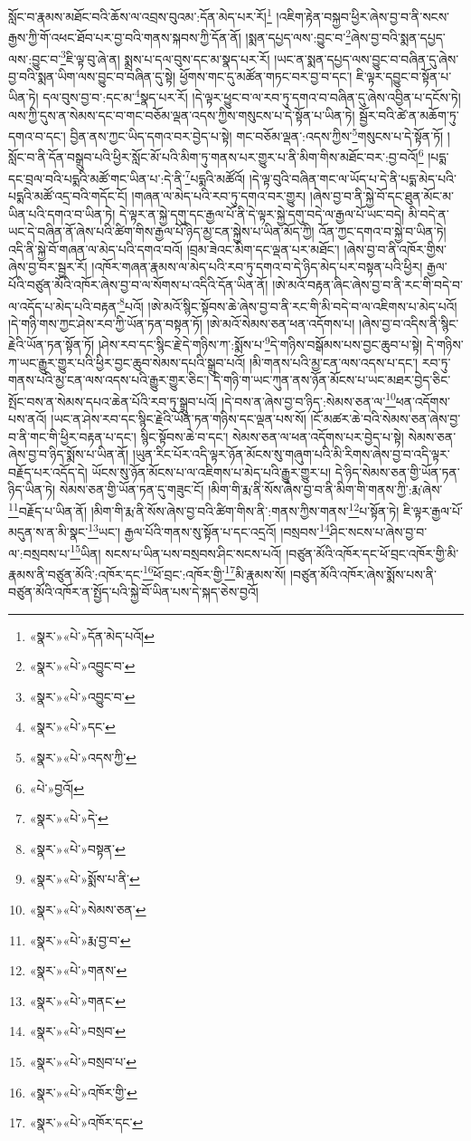 སློང་བ་རྣམས་མཐོང་བའི་ཆོས་ལ་འབྲས་བུའམ་:དོན་མེད་པར་རོ།\footnote{«སྣར་»«པེ་»དོན་མེད་པའོ།} །འཇིག་རྟེན་བསྐྱབ་ཕྱིར་ཞེས་བྱ་བ་ནི་སངས་རྒྱས་ཀྱི་གོ་འཕང་ཐོབ་པར་བྱ་བའི་གནས་སྐབས་ཀྱི་དོན་ནོ། །སྨན་དཔྱད་ལས་:བྱུང་བ་\footnote{«སྣར་»«པེ་»འབྱུང་བ་}ཞེས་བྱ་བའི་སྨན་དཔྱད་ལས་:བྱུང་བ་\footnote{«སྣར་»«པེ་»འབྱུང་བ་}ཇི་ལྟ་བུ་ཞེ་ན། སྨྲས་པ་དལ་བུས་དང་མ་སྣད་པར་རོ། །ཡང་ན་སྨན་དཔྱད་ལས་བྱུང་བ་བཞིན་དུ་ཞེས་བྱ་བའི་སྨན་ཡིག་ལས་བྱུང་བ་བཞིན་དུ་སྟེ། ཕྱོགས་གང་དུ་མཚོན་གཏང་བར་བྱ་བ་དང་། ཇི་ལྟར་དབྱུང་བ་སྟོན་པ་ཡིན་ཏེ། དལ་བུས་བྱ་བ་:དང་མ་\footnote{«སྣར་»«པེ་»དང་}སྣད་པར་རོ། །དེ་ལྟར་ཕྱུང་བ་ལ་རབ་ཏུ་དགའ་བ་བཞིན་དུ་ཞེས་འབྱིན་པ་དངོས་ཏེ། ལས་ཀྱི་དུས་ན་སེམས་དང་བ་གང་བཅོམ་ལྡན་འདས་ཀྱིས་གསུངས་པ་དེ་སྟོན་པ་ཡིན་ཏེ། སྦྱོར་བའི་ཚེ་ན་མཆོག་ཏུ་དགའ་བ་དང་། བྱིན་ནས་ཀྱང་ཡིད་དགའ་བར་བྱེད་པ་སྟེ། གང་བཅོམ་ལྡན་:འདས་ཀྱིས་\footnote{«སྣར་»«པེ་»འདས་ཀྱི་}གསུངས་པ་དེ་སྟོན་ཏོ། །སློང་བ་ནི་དོན་བསྒྲུབ་པའི་ཕྱིར་སློང་མོ་པའི་མིག་ཏུ་གནས་པར་གྱུར་པ་ནི་མིག་གིས་མཐོང་བར་:བྱ་བའོ།\footnote{«པེ་»བྱའོ།} །པདྨ་དང་བྲལ་བའི་པདྨའི་མཚོ་གང་ཡིན་པ་:དེ་ནི་\footnote{«སྣར་»«པེ་»དེ་}པདྨའི་མཚོའོ། །དེ་ལྟ་བུའི་བཞིན་གང་ལ་ཡོད་པ་དེ་ནི་པདྨ་མེད་པའི་པདྨའི་མཚོ་འདྲ་བའི་གདོང་ངོ། །གཞན་ལ་མེད་པའི་རབ་ཏུ་དགའ་བར་གྱུར། །ཞེས་བྱ་བ་ནི་སྐྱེ་བོ་དང་ཐུན་མོང་མ་ཡིན་པའི་དགའ་བ་ཡིན་ཏེ། དེ་ལྟར་ན་སྐྱེ་དགུ་དང་རྒྱལ་པོ་ནི་དེ་ལྟར་སྐྱེ་དགུ་བདེ་ལ་རྒྱལ་པོ་ཡང་བདེ། མི་བདེ་ན་ཡང་དེ་བཞིན་ནོ་ཞེས་པའི་ཚིག་གིས་རྒྱལ་པོ་ཉིད་མྱ་ངན་སྐྱེས་པ་ཡིན་མོད་ཀྱི། འོན་ཀྱང་དགའ་བ་སྐྱེ་བ་ཡིན་ཏེ། འདི་ནི་སྐྱེ་བོ་གཞན་ལ་མེད་པའི་དགའ་བའོ། །བྲམ་ཟེའང་མིག་དང་ལྡན་པར་མཐོང་། །ཞེས་བྱ་བ་ནི་འཁོར་གྱིས་ཞེས་བྱ་བར་སྦྱར་རོ། །འཁོར་གཞན་རྣམས་ལ་མེད་པའི་རབ་ཏུ་དགའ་བ་དེ་ཉིད་མེད་པར་བསྟན་པའི་ཕྱིར། རྒྱལ་པོའི་བཙུན་མོའི་འཁོར་ཞེས་བྱ་བ་ལ་སོགས་པ་འདིའི་དོན་ཡིན་ནོ། །ཨེ་མའོ་བརྟན་ཞིང་ཞེས་བྱ་བ་ནི་རང་གི་བདེ་བ་ལ་འདོད་པ་མེད་པའི་བརྟན་\footnote{«སྣར་»«པེ་»བསྟན་}པའོ། །ཨེ་མའོ་སྙིང་སྟོབས་ཆེ་ཞེས་བྱ་བ་ནི་རང་གི་མི་བདེ་བ་ལ་འཇིགས་པ་མེད་པའོ། །དེ་གཉི་གས་ཀྱང་ཤེས་རབ་ཀྱི་ཡོན་ཏན་བསྟན་ཏོ། །ཨེ་མའོ་སེམས་ཅན་ཕན་འདོགས་པ། །ཞེས་བྱ་བ་འདིས་ནི་སྙིང་རྗེའི་ཡོན་ཏན་སྟོན་ཏོ། །ཤེས་རབ་དང་སྙིང་རྗེ་དེ་གཉིས་ཀ་:སྨོས་པ་\footnote{«སྣར་»«པེ་»སྨོས་པ་ནི་}དེ་གཉིས་བསྒོམས་པས་བྱང་ཆུབ་པ་སྟེ། དེ་གཉིས་ཀ་ཡང་རྒྱུར་གྱུར་པའི་ཕྱིར་བྱང་ཆུབ་སེམས་དཔའི་སྒྲུབ་པའོ། །མི་གནས་པའི་མྱ་ངན་ལས་འདས་པ་དང་། རབ་ཏུ་གནས་པའི་མྱ་ངན་ལས་འདས་པའི་རྒྱུར་གྱུར་ཅིང་། དེ་གཉི་ག་ཡང་ཀུན་ནས་ཉོན་མོངས་པ་ཡང་མཐར་བྱེད་ཅིང་སྤོང་བས་ན་སེམས་དཔའ་ཆེན་པོའི་རབ་ཏུ་སྒྲུབ་པའོ། །དེ་བས་ན་ཞེས་བྱ་བ་ཉིད་:སེམས་ཅན་ལ་\footnote{«སྣར་»«པེ་»སེམས་ཅན་}ཕན་འདོགས་པས་ནའོ། །ཡང་ན་ཤེས་རབ་དང་སྙིང་རྗེའི་ཡོན་ཏན་གཉིས་དང་ལྡན་པས་སོ། །ངོ་མཚར་ཆེ་བའི་སེམས་ཅན་ཞེས་བྱ་བ་ནི་གང་གི་ཕྱིར་བརྟན་པ་དང་། སྙིང་སྟོབས་ཆེ་བ་དང་། སེམས་ཅན་ལ་ཕན་འདོགས་པར་བྱེད་པ་སྟེ། སེམས་ཅན་ཞེས་བྱ་བ་ཉིད་སྨོས་པ་ཡིན་ནོ། །ཡུན་རིང་པོར་འདི་ལྟར་ཉོན་མོངས་སུ་གཞུག་པའི་མི་རིགས་ཞེས་བྱ་བ་འདི་ལྟར་བརྗོད་པར་འདོད་དེ། ཡོངས་སུ་ཉོན་མོངས་པ་ལ་འཇིགས་པ་མེད་པའི་རྒྱུར་གྱུར་པ། དེ་ཉིད་སེམས་ཅན་གྱི་ཡོན་ཏན་ཉིད་ཡིན་ཏེ། སེམས་ཅན་གྱི་ཡོན་ཏན་དུ་གཟུང་ངོ། །མིག་གི་རྨ་ནི་སོས་ཞེས་བྱ་བ་ནི་མིག་གི་གནས་ཀྱི་:རྨ་ཞེས་\footnote{«སྣར་»«པེ་»རྨ་བྱ་བ་}བརྗོད་པ་ཡིན་ནོ། །མིག་གི་རྨ་ནི་སོས་ཞེས་བྱ་བའི་ཚིག་གིས་ནི་:གནས་ཀྱིས་གནས་\footnote{«སྣར་»«པེ་»གནས་}པ་སྟོན་ཏེ། ཇི་ལྟར་རྒྱལ་པོ་མདུན་ས་ན་མི་སྣང་\footnote{«སྣར་»«པེ་»གནང་}ཡང་། རྒྱལ་པོའི་གནས་སུ་སྟོན་པ་དང་འདྲའོ། །བསྲབས་\footnote{«སྣར་»«པེ་»བསྲབ་}ཤིང་སངས་པ་ཞེས་བྱ་བ་ལ་:བསྲབས་པ་\footnote{«སྣར་»«པེ་»བསྲབ་པ་}ཡིན། སངས་པ་ཡིན་པས་བསྲབས་ཤིང་སངས་པའོ། །བཙུན་མོའི་འཁོར་དང་ཕོ་བྲང་འཁོར་གྱི་མི་རྣམས་ནི་བཙུན་མོའི་:འཁོར་དང་\footnote{«སྣར་»«པེ་»འཁོར་གྱི་}ཕོ་བྲང་:འཁོར་གྱི་\footnote{«སྣར་»«པེ་»འཁོར་དང་}མི་རྣམས་སོ། །བཙུན་མོའི་འཁོར་ཞེས་སྨོས་པས་ནི་བཙུན་མོའི་འཁོར་ན་སྤྱོད་པའི་སྐྱེ་བོ་ཡིན་པས་དེ་སྐད་ཅེས་བྱའོ། 